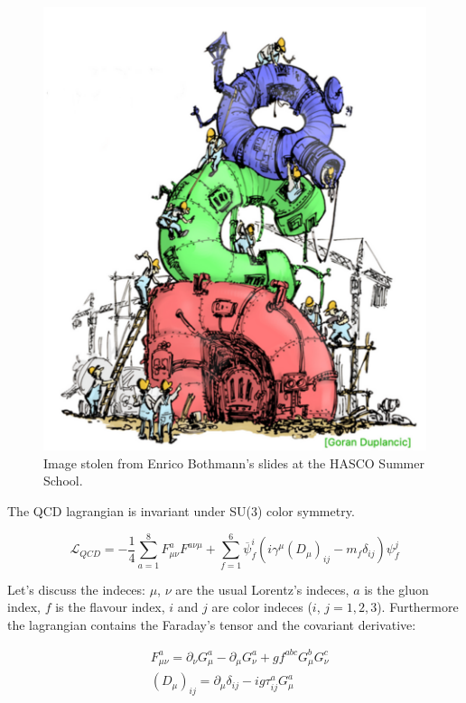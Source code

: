 \begin{figure}[h]
    \centering
    \includegraphics[scale=0.25]{Chapters/Chapter1/Images/qcd.pdf}
    \caption{Image stolen from Enrico Bothmann's slides at the HASCO Summer School.}
\end{figure}

The QCD lagrangian is invariant under SU(3) color symmetry.

\begin{equation}
    \mathcal{L}_{QCD} = - \frac{1}{4} \sum_{a=1}^{8} F^a_{\mu \nu}F^{a \nu \mu} + \sum_{f=1}^{6} \overbar{\psi}_f^i
    (i \gamma^{\mu} (D_{\mu})_{ij} - m_f \delta_{ij}) \psi_f^j
\end{equation}

Let's discuss the indeces: $\mu$, $\nu$ are the usual Lorentz's indeces, $a$ is the gluon index, $f$ is the
flavour index, $i$ and $j$ are color indeces ($i$, $j = 1, 2, 3$).
Furthermore the lagrangian contains the Faraday's tensor and the covariant derivative:

\begin{align}
    &F^a_{\mu \nu} = \partial_{\nu} G^a_{\mu} - \partial_{\mu} G^a_{\nu} + g f^{abc}G_{\mu}^{b}G^c_{\nu} \\
    &(D_{\mu})_{ij} = \partial_{\mu} \delta_{ij} - i g \tau^a_{ij} G^a_{\mu}
\end{align}

